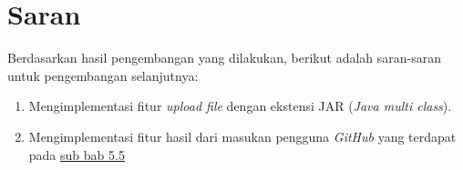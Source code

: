 \section{Saran}
Berdasarkan hasil pengembangan yang dilakukan, berikut adalah saran-saran untuk pengembangan selanjutnya:
\begin{enumerate}
	\item Mengimplementasi fitur \textit{upload file} dengan ekstensi JAR (\textit{Java multi class}).
	\item Mengimplementasi fitur hasil dari masukan pengguna \textit{GitHub} yang terdapat pada \hyperref[sec:masukangithub]{sub bab 5.5}
\end{enumerate}